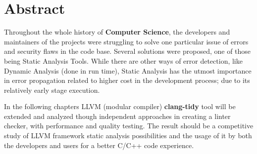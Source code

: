 \section{Abstract}

Throughout the whole history of \textbf{Computer Science}, the developers and maintainers of the projects were struggling to solve one particular issue of errors and security flaws in the code base. Several solutions were proposed, one of those being Static Analysis Tools. While there are other ways of error detection, like Dynamic Analysis (done in run time), Static Analysis has the utmost importance in error propagation  related to higher cost in the development process; due to its relatively early stage execution. 

In the following chapters LLVM (modular compiler) \textbf{clang-tidy} tool will be extended and analyzed though independent approaches in creating a linter checker, with performance and quality testing. The result should be a competitive study of LLVM framework static analysis possibilities and the usage of it by both the developers and users for a better C/C++ code experience.

